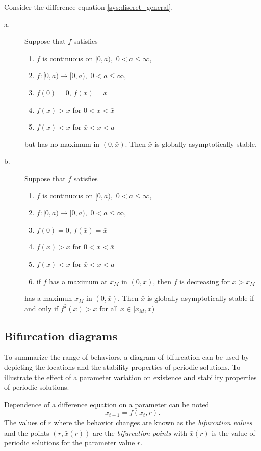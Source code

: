 \begin{theorem}\label{th:FP_gas_discrete_4}
Consider the difference equation \eqref{sys:discret_general}.
\begin{description}
\item[a.]Suppose that $f$ satisfies
\begin{enumerate}
\item $f$ is continuous on $[0,a),$ $0<a\leq \infty$,
\item $f: [0,a)\rightarrow [0,a),$ $0<a\leq \infty$,
\item $f(0)=0$, $f(\bar x)=\bar x$ 
\item $f(x)>x$ for $0<x<\bar x$
\item $f(x)<x$ for $\bar x<x<a$
\end{enumerate}
but has no maximum in $(0,\bar x)$. Then $\bar x$ is globally asymptotically stable.
\item[b.]Suppose that $f$ satisfies
\begin{enumerate}
\item $f$ is continuous on $[0,a),$ $0<a\leq \infty$,
\item $f: [0,a)\rightarrow [0,a),$ $0<a\leq \infty$,
\item $f(0)=0$, $f(\bar x)=\bar x$ 
\item $f(x)>x$ for $0<x<\bar x$
\item $f(x)<x$ for $\bar x<x<a$
\item if $f$ has a maximum at $x_M$ in $(0,\bar x)$, then $f$ is decreasing for $x>x_M$
\end{enumerate}
has a maximun $x_M$ in $(0,\bar x)$. Then $\bar x$ is globally asymptotically stable if and only if $f^2(x)>x$ for all $x\in [x_M,\bar x)$
\end{description}
\end{theorem}



\subsection{Bifurcation diagrams}
To summarize the range of behaviors, a diagram of bifurcation can be used by  depicting the locations and the stability properties of periodic solutions. To illustrate the effect of a parameter variation on existence and stability properties of periodic solutions. 

Dependence of a difference equation on a parameter can be noted
$$x_{t+1}=f(x_t,r).$$
The values of $r$ where the behavior changes are known as the \emph{bifurcation values} and the points $(r,\bar x(r))$ are the \emph{bifurcation points}  with $\bar x(r)$ is the value of periodic solutions for the parameter value $r$.


